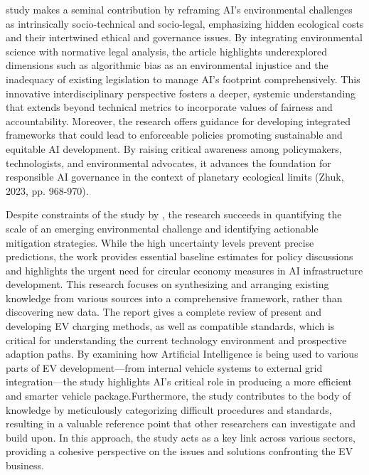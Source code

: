 \documentclass[a4paper, 12pt]{article}
\begin{document}
\par \citet{Zhuk2023} study makes a seminal contribution by reframing AI’s environmental challenges as intrinsically socio-technical and socio-legal, emphasizing hidden ecological costs and their intertwined ethical and governance issues. By integrating environmental science with normative legal analysis, the article highlights underexplored dimensions such as algorithmic bias as an environmental injustice and the inadequacy of existing legislation to manage AI’s footprint comprehensively. This innovative interdisciplinary perspective fosters a deeper, systemic understanding that extends beyond technical metrics to incorporate values of fairness and accountability. Moreover, the research offers guidance for developing integrated frameworks that could lead to enforceable policies promoting sustainable and equitable AI development. By raising critical awareness among policymakers, technologists, and environmental advocates, it advances the foundation for responsible AI governance in the context of planetary ecological limits (Zhuk, 2023, pp. 968-970). \hfill \break
\par Despite constraints of the study by \cite{wang_2024_ewaste}, the research succeeds in quantifying the scale of an emerging environmental challenge and identifying actionable mitigation strategies. While the high uncertainty levels prevent precise predictions, the work provides essential baseline estimates for policy discussions and highlights the urgent need for circular economy measures in AI infrastructure development.
This research \citet{M.rauf2024} focuses on synthesizing and arranging existing knowledge from various sources into a comprehensive framework, rather than discovering new data.  The report gives a complete review of present and developing EV charging methods, as well as compatible standards, which is critical for understanding the current technology environment and prospective adaption paths.  By examining how Artificial Intelligence is being used to various parts of EV development—from internal vehicle systems to external grid integration—the study highlights AI's critical role in producing a more efficient and smarter vehicle package.Furthermore, the study contributes to the body of knowledge by meticulously categorizing difficult procedures and standards, resulting in a valuable reference point that other researchers can investigate and build upon.  In this approach, the study acts as a key link across various sectors, providing a cohesive perspective on the issues and solutions confronting the EV business.
\end{document}
